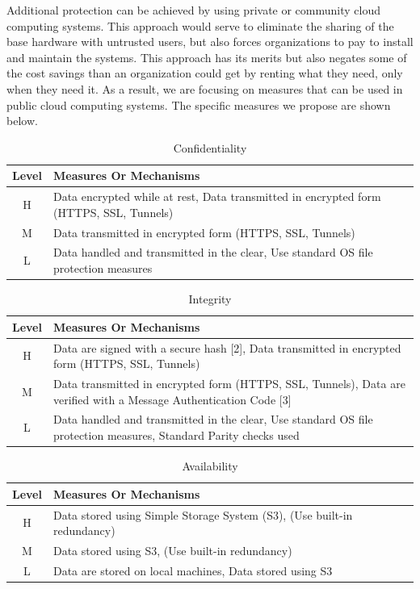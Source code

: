 \documentclass{sig-alternate}
\begin{document}
Additional protection can be achieved by using private or community cloud computing systems.  This approach would serve to eliminate the sharing of the base hardware with untrusted users, but also forces organizations to pay to install and maintain the systems.  This approach has its merits but also negates some of the cost savings than an organization could get by renting what they need, only when they need it.  As a result, we are focusing on measures that can be used in public cloud computing systems.  The specific measures we propose are shown below.

\begin{table}[ht]
\begin{tabular}{|c|p{2.5in}|}
\hline
Level &  Measures Or Mechanisms \\
\hline
H & Data encrypted while at rest, 
    Data transmitted in encrypted form (HTTPS, SSL, Tunnels) \\
\hline
M & Data transmitted in encrypted form (HTTPS, SSL, Tunnels) \\
\hline
L & Data handled and transmitted in the clear,
    Use standard OS file protection measures \\
\hline
\end{tabular}
\caption{Confidentiality}
\end{table}

\begin{table}[ht]
\begin{tabular}{|c|p{2.5in}|}
\hline
Level &  Measures Or Mechanisms \\
\hline
H & Data are signed with a secure hash [2],
    Data transmitted in encrypted form (HTTPS, SSL, Tunnels)\\
\hline
M & Data transmitted in encrypted form (HTTPS, SSL, Tunnels),
    Data are verified with a Message Authentication Code [3]\\
\hline
L & Data handled and transmitted in the clear,
    Use standard OS file protection measures, 
    Standard Parity checks used\\
\hline
\end{tabular}
\caption{Integrity}
\end{table}

\begin{table}[ht]
\begin{tabular}{|c|p{2.5in}|}
\hline
Level &  Measures Or Mechanisms \\
\hline
H & Data stored using Simple Storage System (S3),
    (Use built-in redundancy) \\
\hline  
M & Data stored using S3,
    (Use built-in redundancy)\\
\hline
L & Data are stored on local machines,
    Data stored using S3 \\
\hline
\end{tabular}  
\caption{Availability}
\end{table}
\end{document}
